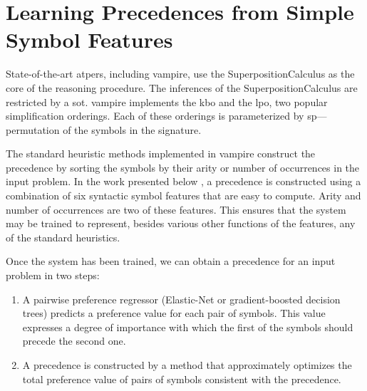 \newcommand*{\IncludePaper}[2][height=\paperheight-1.5in]{}

\newcommand{\ResultSection}{\chapter}


\ResultSection{Learning Precedences from Simple Symbol Features}
\label{sec:results:simple}

State-of-the-art \glspl{atper}, including \gls{vampire}, use the \gls{SuperpositionCalculus} as the core of the reasoning procedure.
The inferences of the \gls{SuperpositionCalculus} are restricted by a \gls{sot}.
\Gls{vampire} implements the \acrfull{kbo} and the \gls{lpo}, two popular simplification orderings.
Each of these orderings is parameterized by \gls{sp}---permutation of the symbols in the signature.

The standard heuristic methods implemented in \gls{vampire} construct the \gls{precedence} by sorting the symbols by their arity or number of occurrences in the input problem.
In the work presented below \cite{DBLP:conf/cade/Bartek020},
a \gls{precedence} is constructed using a combination of six syntactic symbol features that are easy to compute.
Arity and number of occurrences are two of these features.
This ensures that the system may be trained to represent, besides various other functions of the features, any of the standard heuristics.

Once the system has been trained,
we can obtain a precedence for an input problem in two steps:
\begin{enumerate}
\item A pairwise preference regressor (Elastic-Net or gradient-boosted decision trees) predicts a preference value for each pair of symbols.
This value expresses a degree of importance with which the first of the symbols should precede the second one.
\item A precedence is constructed
by a method that approximately optimizes the total preference value of pairs of symbols consistent with the precedence.
\end{enumerate}


